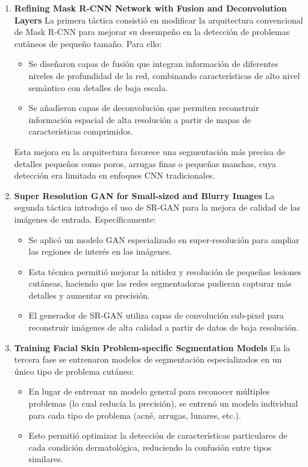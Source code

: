 \begin{enumerate}[label=\textbf{\arabic*.}, leftmargin=2em]
    \item \textbf{Refining Mask R-CNN Network with Fusion and Deconvolution Layers}
	La primera táctica consistió en modificar la arquitectura convencional de Mask R-CNN para mejorar su desempeño en la detección de problemas cutáneos de pequeño tamaño. Para ello:
	
	\begin{itemize}
		\item Se diseñaron capas de fusión que integran información de diferentes niveles de profundidad de la red, combinando características de alto nivel semántico con detalles de baja escala.
		\item Se añadieron capas de deconvolución que permiten reconstruir información espacial de alta resolución a partir de mapas de características comprimidos.
	\end{itemize}
	Esta mejora en la arquitectura favorece una segmentación más precisa de detalles pequeños como poros, arrugas finas o pequeñas manchas, cuya detección era limitada en enfoques CNN tradicionales.
	
	\item \textbf{Super Resolution GAN for Small-sized and Blurry Images}
	La segunda táctica introdujo el uso de SR-GAN para la mejora de calidad de las imágenes de entrada. Específicamente:
	
	\begin{itemize}
		\item Se aplicó un modelo GAN especializado en super-resolución para ampliar las regiones de interés en las imágenes.
		\item Esta técnica permitió mejorar la nitidez y resolución de pequeñas lesiones cutáneas, haciendo que las redes segmentadoras pudieran capturar más detalles y aumentar su precisión.
		\item El generador de SR-GAN utiliza capas de convolución sub-pixel para reconstruir imágenes de alta calidad a partir de datos de baja resolución.
	\end{itemize}
	
	\item \textbf{Training Facial Skin Problem-specific Segmentation Models}
	En la tercera fase se entrenaron modelos de segmentación especializados en un único tipo de problema cutáneo:
	
	\begin{itemize}
		\item En lugar de entrenar un modelo general para reconocer múltiples problemas (lo cual reducía la precisión), se entrenó un modelo individual para cada tipo de problema (acné, arrugas, lunares, etc.).
		\item Esto permitió optimizar la detección de características particulares de cada condición dermatológica, reduciendo la confusión entre tipos similares.
	\end{itemize}


\end{enumerate}
